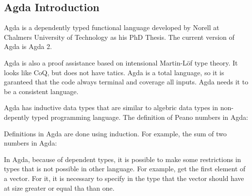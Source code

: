 \documentclass[12pt]{article}
\begin{document}


\subsection{Agda Introduction}

Agda is a dependently typed functional language developed by Norell at Chalmers University of Technology as his PhD Thesis.
The current version of Agda is Agda 2.

Agda is also a proof assistance based on intensional Martin-Löf type theory.
It looks like CoQ, but does not have tatics.
Agda is a total language, so it is garanteed that the code always terminal and coverage all inputs.
Agda needs it to be a consistent language.

Agda has inductive data types that are similar to algebric data types in non-depently typed programming language.
The definition of Peano numbers in Agda:


Definitions in Agda are done using induction.
For example, the sum of two numbers in Agda:


In Agda, because of dependent types, it is possible to make some restrictions in types that is not possible in other language.
For example, get the first element of a vector.
For it, it is necessary to specify in the type that the vector should have at size greater or equal tha than one.
\end{document}
